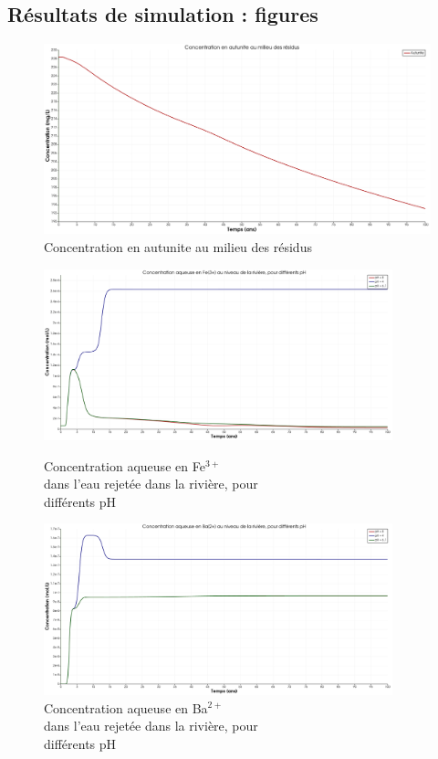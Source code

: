 \documentclass{article}
\begin{document}
\subsection{Résultats de simulation : figures}

\begin{figure}[H]
    \centering
    \includegraphics[width=0.5\linewidth]{III_B_2_2.png}
    \caption{Concentration en autunite au milieu des résidus}
    \label{fig:annexe_autunite_residus_sable_base}
\end{figure}

\begin{figure}[H]
    \centering
    \begin{minipage}{0.5\textwidth}
        \centering
        \includegraphics[width=0.9\textwidth]{III_B_2_13.png} 
        \caption{Concentration aqueuse en Fe$^{3+}$ \\dans l'eau rejetée dans la rivière, pour \\différents pH}
        \label{fig:Fe_riviere_comparaison}
    \end{minipage}\hfill
    \begin{minipage}{0.5\textwidth}
        \centering
        \includegraphics[width=0.9\textwidth]{III_B_2_14.png} 
        \caption{Concentration aqueuse en Ba$^{2+}$ \\dans l'eau rejetée dans la rivière, pour \\différents pH}
        \label{fig:Ba_rivier_comparaison}
    \end{minipage}
\end{figure}
\end{document}
